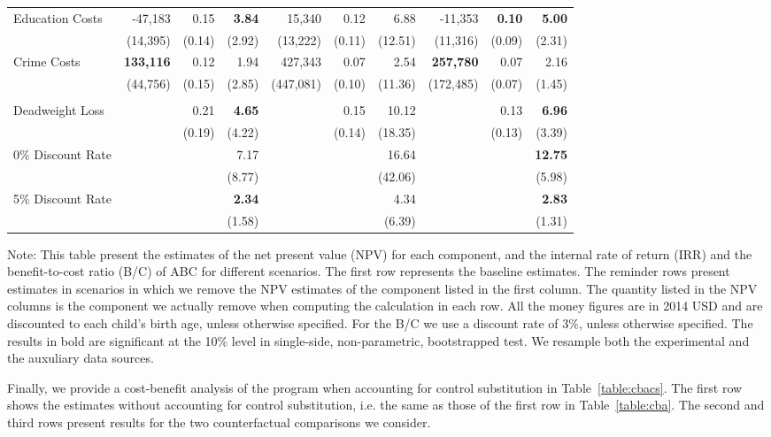 \begin{table}
\begin{threeparttable}
\begin{tabular}{l r r r r r r r r r}
Education Costs	&	-47,183	&	0.15	&	\textbf{3.84}	&	15,340	&	0.12	&	6.88	&	-11,353	&	\textbf{0.10}	&	\textbf{5.00}	\\
	&	(14,395)	&	(0.14)	&	(2.92)	&	(13,222)	&	(0.11)	&	(12.51)	&	(11,316)	&	(0.09)	&	(2.31)	\\
Crime Costs	&	\textbf{133,116}	&	0.12	&	1.94	&	427,343	&	0.07	&	2.54	&	\textbf{257,780}	&	0.07	&	2.16	\\
	&	(44,756)	&	(0.15)	&	(2.85)	&	(447,081)	&	(0.10)	&	(11.36)	&	(172,485)	&	(0.07)	&	(1.45)	\\ \\
Deadweight Loss	&		&	0.21	&	\textbf{4.65}	&		&	0.15	&	10.12	&		&	0.13	&	\textbf{6.96}	\\
	&		&	(0.19)	&	(4.22)	&		&	(0.14)	&	(18.35)	&		&	(0.13)	&	(3.39)	\\
0\% Discount Rate	&		&		&	7.17	&		&		&	16.64	&		&		&	\textbf{12.75}	\\
	&		&		&	(8.77)	&		&		&	(42.06)	&		&		&	(5.98)	\\
5\% Discount Rate	&		&		&	\textbf{2.34}	&		&		&	4.34	&		&		&	\textbf{2.83}	\\
	&		&		&	(1.58)	&		&		&	(6.39)	&		&		&	(1.31)	\\
\bottomrule
\end{tabular}
\begin{tablenotes}
\item Note: This table present the estimates of the net present value (NPV) for each component, and the internal rate of return (IRR) and the benefit-to-cost ratio (B/C) of ABC for different scenarios. The first row represents the baseline estimates. The reminder rows present estimates in scenarios in which we remove the NPV estimates of the component listed in the first column. The quantity listed in the NPV columns is the component we actually remove when computing the calculation in each row. All the money figures are in 2014 USD and are discounted to each child's birth age, unless otherwise specified. For the B/C we use a discount rate of $3\%$, unless otherwise specified. The results in bold are significant at the 10\% level in single-side, non-parametric, bootstrapped test. We resample both the experimental and the auxuliary data sources. 
\end{tablenotes}
\end{threeparttable}
\end{table}

\noindent Finally, we provide a cost-benefit analysis of the program when accounting for control substitution in Table~\ref{table:cbacs}. The first row shows the estimates without accounting for control substitution, i.e. the same as those of the first row in Table~\ref{table:cba}. The second and third rows present results for the two counterfactual comparisons we consider.\\ 

